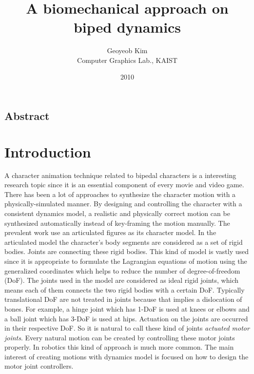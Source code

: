 \documentclass[a4paper,10pt]{article}
\begin{document}
\title{A biomechanical approach on biped dynamics}

\author{Geoyeob Kim\\
Computer Graphics Lab., KAIST
}
\date{2010}
\maketitle

\pagebreak

\setcounter{page}{1}
\subsection*{Abstract}
\pagebreak


\tableofcontents
\pagebreak


\listoffigures 	%
\pagebreak

\listoftables
\pagebreak

\setcounter{page}{1}

\section{Introduction}
A character animation technique related to bipedal characters is
a interesting research topic since it is an essential component
of every movie and video game. There has been a lot of approaches
to synthesize the character motion with a physically-simulated manner.
By designing and controlling the character
with a consistent dynamics model, a realistic and physically correct
motion can be synthesized automatically instead of key-framing the motion
manually. The prevalent work use an articulated figures as its character model.
In the articulated model the character's body segments are considered
as a set of rigid bodies. Joints are connecting these rigid bodies.
This kind of model is
vastly used since it is appropriate to formulate the Lagrangian equations of motion
using the generalized coordinates which helps to reduce the number
of degree-of-freedom (DoF).
The joints used in the model are considered as ideal rigid joints, which means
each of them connects the two rigid bodies with a certain DoF. Typically
translational DoF are not treated in joints because that implies
a dislocation of bones.
For example, a hinge joint which has 1-DoF is used at knees or elbows and a ball joint
which has 3-DoF is used at hips. Actuation on the joints are occurred
in their respective DoF. So it is natural to call these kind of joints
\emph{actuated motor joints}. Every natural motion can be created by
controlling these motor joints properly. In robotics this kind of
approach is much more common. The main interest of creating motions
with dynamics model is focused on how to design the motor joint controllers.
\end{document}

